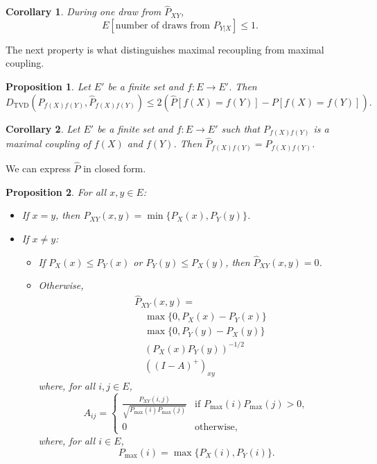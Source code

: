 \documentclass{article}
\newtheorem{proposition}{Proposition}
\newtheorem{corollary}{Corollary}
\begin{document}
\begin{corollary}
    During one draw from $\hat{P}_{XY}$,
    \[
        E[\text{number of draws from \(P_{Y|X}\)}] \le 1.
    \]
\end{corollary}

The next property is what distinguishes maximal recoupling from maximal coupling.

\begin{proposition}
    Let $E'$ be a finite set and $f : E \to E'$. Then
    \[
    D_{\text{TVD}}(P_{f(X)f(Y)}, \hat{P}_{f(X)f(Y)})
    \le 2 \left(\hat{P}[f(X) = f(Y)] - P[f(X) = f(Y)]\right).
    \]
\end{proposition}

\begin{corollary}
    Let $E'$ be a finite set and $f : E \to E'$ such that
    $P_{f(X)f(Y)}$ is a maximal coupling of $f(X)$ and $f(Y)$.
    Then $\hat{P}_{f(X)f(Y)} = P_{f(X)f(Y)}$.
\end{corollary}

We can express $\hat{P}$ in closed form.

\begin{proposition}
    For all $x, y \in E$:
    \begin{itemize}
        \item If $x = y$, then $\hat{P}_{XY}(x,y) = \min \{ P_X(x), P_Y(y) \}$.
        \item If $x \neq y$:
        \begin{itemize}
            \item If $P_X(x) \leq P_Y(x)$ or $P_Y(y) \leq P_X(y)$, then $\hat{P}_{XY}(x,y) = 0$.
            \item Otherwise,
\begin{align*}
&\hat{P}_{XY}(x,y) = \\
&\quad\max \{ 0, P_X(x) - P_Y(x) \} \\
&\quad\max \{ 0, P_Y(y) - P_X(y) \} \\
&\quad\left( P_X(x) P_Y(y) \right)^{-1/2} \\
&\quad\left( (I - A)^+ \right)_{xy}
\end{align*}
                where, for all $i,j \in E$,
\[
A_{ij} =
\begin{cases}
    \frac{P_{XY}(i,j)}{\sqrt{P_{\text{max}}(i) P_{\text{max}}(j)}} & \text{if } P_{\text{max}}(i) P_{\text{max}}(j) > 0, \\
    0 & \text{otherwise},
\end{cases}
\]
                where, for all $i \in E$,
\[
P_{\text{max}}(i) = \max \{ P_X(i), P_Y(i) \}.
\]
        \end{itemize}
    \end{itemize}
\end{proposition}
\end{document}
